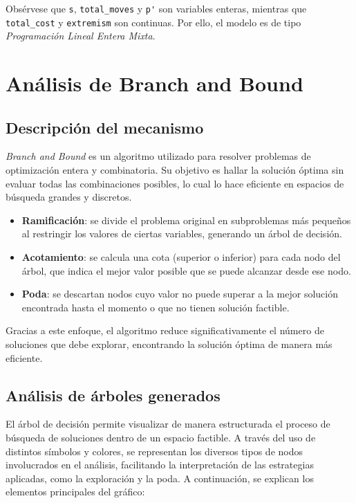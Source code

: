 Obsérvese que \texttt{s}, \texttt{total\_moves} y \texttt{p\'} son variables enteras, mientras que \texttt{total\_cost} y \texttt{extremism} son continuas. Por ello, el modelo es de tipo \emph{Programación Lineal Entera Mixta}.

\section{Análisis de Branch and Bound}

\subsection{Descripción del mecanismo}

\textit{Branch and Bound} es un algoritmo utilizado para resolver problemas de optimización entera y combinatoria. Su objetivo es hallar la solución óptima sin evaluar todas las combinaciones posibles, lo cual lo hace eficiente en espacios de búsqueda grandes y discretos.

\begin{itemize}
	\item \textbf{Ramificación}: se divide el problema original en subproblemas más pequeños al restringir los valores de ciertas variables, generando un árbol de decisión.

	\item \textbf{Acotamiento}: se calcula una cota (superior o inferior) para cada nodo del árbol, que indica el mejor valor posible que se puede alcanzar desde ese nodo.

	\item \textbf{Poda}: se descartan nodos cuyo valor no puede superar a la mejor solución encontrada hasta el momento o que no tienen solución factible.
\end{itemize}

Gracias a este enfoque, el algoritmo reduce significativamente el número de soluciones que debe explorar, encontrando la solución óptima de manera más eficiente.

\subsection{Análisis de árboles generados}

El árbol de decisión permite visualizar de manera estructurada el proceso de búsqueda de soluciones dentro de un espacio factible. A través del uso de distintos símbolos y colores, se representan los diversos tipos de nodos involucrados en el análisis, facilitando la interpretación de las estrategias aplicadas, como la exploración y la poda. A continuación, se explican los elementos principales del gráfico:

